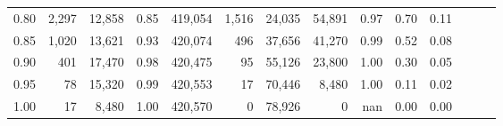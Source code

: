 \begin{tabular}{rrrrrrrrrrrrrr}
0.80 &   2,297 &  12,858 &  0.85 &  419,054 &    1,516 &  24,035 &  54,891 &  0.97 &  0.70 &      0.11 \\
0.85 &   1,020 &  13,621 &  0.93 &  420,074 &      496 &  37,656 &  41,270 &  0.99 &  0.52 &      0.08 \\
0.90 &     401 &  17,470 &  0.98 &  420,475 &       95 &  55,126 &  23,800 &  1.00 &  0.30 &      0.05 \\
0.95 &      78 &  15,320 &  0.99 &  420,553 &       17 &  70,446 &   8,480 &  1.00 &  0.11 &      0.02 \\
1.00 &      17 &   8,480 &  1.00 &  420,570 &        0 &  78,926 &       0 &   nan &  0.00 &      0.00 \\
\bottomrule
\end{tabular}
